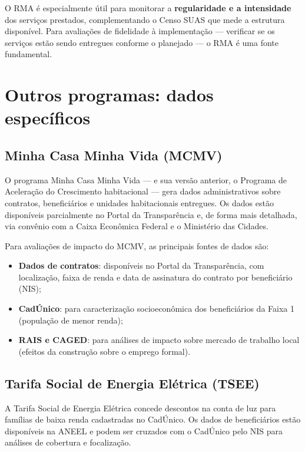 O RMA é especialmente útil para monitorar a \textbf{regularidade e a intensidade} dos serviços prestados, complementando o Censo SUAS que mede a estrutura disponível. Para avaliações de fidelidade à implementação — verificar se os serviços estão sendo entregues conforme o planejado — o RMA é uma fonte fundamental.

\section{Outros programas: dados específicos}

\subsection{Minha Casa Minha Vida (MCMV)}

O programa Minha Casa Minha Vida — e sua versão anterior, o Programa de Aceleração do Crescimento habitacional — gera dados administrativos sobre contratos, beneficiários e unidades habitacionais entregues. Os dados estão disponíveis parcialmente no Portal da Transparência e, de forma mais detalhada, via convênio com a Caixa Econômica Federal e o Ministério das Cidades.

Para avaliações de impacto do MCMV, as principais fontes de dados são:
\begin{itemize}
  \item \textbf{Dados de contratos}: disponíveis no Portal da Transparência, com localização, faixa de renda e data de assinatura do contrato por beneficiário (NIS);
  \item \textbf{CadÚnico}: para caracterização socioeconômica dos beneficiários da Faixa 1 (população de menor renda);
  \item \textbf{RAIS e CAGED}: para análises de impacto sobre mercado de trabalho local (efeitos da construção sobre o emprego formal).
\end{itemize}

\subsection{Tarifa Social de Energia Elétrica (TSEE)}

A Tarifa Social de Energia Elétrica concede descontos na conta de luz para famílias de baixa renda cadastradas no CadÚnico. Os dados de beneficiários estão disponíveis na ANEEL e podem ser cruzados com o CadÚnico pelo NIS para análises de cobertura e focalização.

